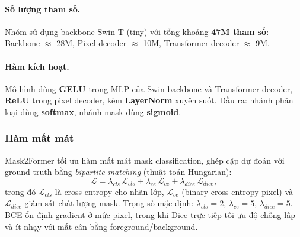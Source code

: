 \paragraph{Số lượng tham số.}
Nhóm sử dụng backbone Swin-T (tiny) với tổng khoảng \textbf{47M tham số}: Backbone $\approx$ 28M, Pixel decoder $\approx$ 10M, Transformer decoder $\approx$ 9M.

\paragraph{Hàm kích hoạt.}
Mô hình dùng \textbf{GELU} trong MLP của Swin backbone và Transformer decoder, \textbf{ReLU} trong pixel decoder, kèm \textbf{LayerNorm} xuyên suốt. Đầu ra: nhánh phân loại dùng \textbf{softmax}, nhánh mask dùng \textbf{sigmoid}.

\subsubsection{Hàm mất mát}
Mask2Former tối ưu hàm mất mát mask classification, ghép cặp dự đoán với ground-truth bằng \emph{bipartite matching} (thuật toán Hungarian):
\[
    \mathcal{L} = \lambda_{cls}\,\mathcal{L}_{cls} + \lambda_{ce}\,\mathcal{L}_{ce} + \lambda_{dice}\,\mathcal{L}_{dice},
\]
trong đó $\mathcal{L}_{cls}$ là cross-entropy cho nhãn lớp, $\mathcal{L}_{ce}$ (binary cross-entropy pixel) và $\mathcal{L}_{dice}$ giám sát chất lượng mask. Trọng số mặc định: $\lambda_{cls}{=}2$, $\lambda_{ce}{=}5$, $\lambda_{dice}{=}5$. BCE ổn định gradient ở mức pixel, trong khi Dice trực tiếp tối ưu độ chồng lấp và ít nhạy với mất cân bằng foreground/background.
